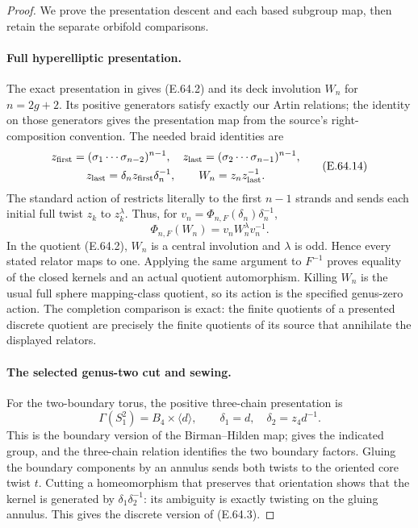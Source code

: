 \begin{proof}
We prove the presentation descent and each based subgroup map,
then retain the separate orbifold comparisons.

\paragraph{Full hyperelliptic presentation.}
The exact presentation in
\cite[Theorems 3.2--3.3, pp.6--7]{BCEndoKamada2016}
gives (E.64.2) and its deck involution $W_n$ for $n=2g+2$.
Its positive generators satisfy exactly our Artin relations;
the identity on those generators gives the presentation map from
the source's right-composition convention.  The needed braid
identities are
\[
 \begin{gathered}
 z_{\rm first}=(\sigma_1\cdots\sigma_{n-2})^{n-1},\quad
 z_{\rm last}=(\sigma_2\cdots\sigma_{n-1})^{n-1},\\
 z_{\rm last}=\delta_n z_{\rm first}\delta_n^{-1},\qquad
 W_n=z_n z_{\rm last}^{-1}.
 \end{gathered}
 \tag{E.64.14}
\]
The standard action of
\cite[(1.1)]{BCNakamuraSchneps2000} restricts literally to the
first $n-1$ strands and sends each initial full twist $z_k$ to
$z_k^\lambda$.  Thus, for
$v_n=\Phi_{n,F}(\delta_n)\delta_n^{-1}$,
\[
                 \Phi_{n,F}(W_n)=v_nW_n^\lambda v_n^{-1}.
 \tag{E.64.15}
\]
In the quotient (E.64.2), $W_n$ is a central involution and
$\lambda$ is odd.  Hence every stated relator maps to one.
Applying the same argument to $F^{-1}$ proves equality of the
closed kernels and an actual quotient automorphism.  Killing
$W_n$ is the usual full sphere mapping-class quotient, so its
action is the specified genus-zero action.  The completion
comparison is exact: the finite quotients of a presented discrete
quotient are precisely the finite quotients of its source that
annihilate the displayed relators.

\paragraph{The selected genus-two cut and sewing.}
For the two-boundary torus, the positive three-chain presentation
is
\[
 \Gamma(S_1^2)=B_4\times\langle d\rangle,\qquad
 \delta_1=d,\quad\delta_2=z_4d^{-1}.
 \tag{E.64.16}
\]
This is the boundary version of the Birman--Hilden map;
\cite[Section 6]{BCMargalitWinarski} gives the indicated group,
and the three-chain relation identifies the two boundary factors.
Gluing the boundary components by an annulus sends both twists
to the oriented core twist $t$.  Cutting a homeomorphism that
preserves that orientation shows that the kernel is generated
by $\delta_1\delta_2^{-1}$: its ambiguity is exactly twisting
on the gluing annulus.  This gives the discrete version of
(E.64.3).


\end{proof}
